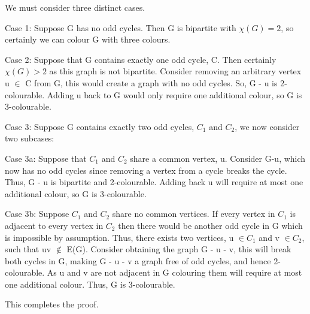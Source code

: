 \documentclass{article}
\begin{document}
We must consider three distinct cases.

Case 1: Suppose G has no odd cycles. Then G is bipartite with $\chi(G) = 2$, so certainly we can colour G with three colours.

Case 2: Suppose that G contains exactly one odd cycle, C. Then certainly $\chi(G) > 2$ as this graph is not bipartite. Consider removing an arbitrary vertex u $\in$ C from G, this would create a graph with no odd cycles. So, G - u is 2-colourable. Adding u back to G would only require one additional colour, so G is 3-colourable.

Case 3: Suppose G contains exactly two odd cycles, $C_1$ and $C_2$, we now consider two subcases:

Case 3a: Suppose that $C_1$ and $C_2$ share a common vertex, u. Consider G-u, which now has no odd cycles since removing a vertex from a cycle breaks the cycle. Thus, G - u is bipartite and 2-colourable. Adding back u will require at most one additional colour, so G is 3-colourable.

Case 3b: Suppose $C_1$ and $C_2$ share no common vertices. If every vertex in $C_1$ is adjacent to every vertex in $C_2$ then there would be another odd cycle in G which is impossible by assumption. Thus, there exists two vertices, u $\in C_1$ and v $\in C_2$, such that uv $\notin$ E(G). Consider obtaining the graph G - u - v, this will break both cycles in G, making G - u - v a graph free of odd cycles, and hence 2-colourable. As u and v are not adjacent in G colouring them will require at most one additional colour. Thus, G is 3-colourable.

This completes the proof.
\end{document}
